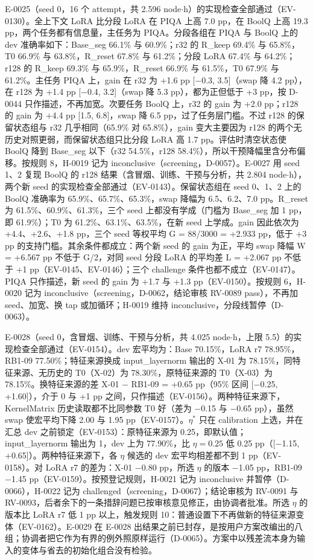\documentclass[11pt]{article}
\begin{document}
E-0025（seed 0，16 个 attempt，共 2.596 node$\cdot$h）的实现检查全部通过（EV-0130）。全上下文 LoRA 比分段 LoRA 在 PIQA 上高 7.0 pp，在 BoolQ 上高 19.3 pp，两个任务都有信息量，主任务为 PIQA。分段各组在 PIQA 与 BoolQ 上的 dev 准确率如下：Base\_seg 66.1\% 与 60.9\%；r32 的 R\_keep 69.4\% 与 65.8\%，T0 66.9\% 与 63.8\%，R\_reset 67.8\% 与 61.2\%；分段 LoRA 67.4\% 与 64.2\%；r128 的 R\_keep 69.3\% 与 65.9\%，R\_reset 66.9\% 与 61.5\%，T0 67.9\% 与 61.2\%。主任务 PIQA 上，gain 在 r32 为 +1.6 pp [$-$0.3, 3.5]（swap 降 4.2 pp），在 r128 为 +1.4 pp [$-$0.4, 3.2]（swap 降 5.3 pp），都为正但低于 +3 pp，按 D-0044 只作描述，不再加宽。次要任务 BoolQ 上，r32 的 gain 为 +2.0 pp；r128 的 gain 为 +4.4 pp [1.5, 6.8]，swap 降 6.5 pp，过了任务层门槛。不过 r128 的保留状态组与 r32 几乎相同（65.9\% 对 65.8\%），gain 变大主要因为 r128 的两个无历史对照更弱，而保留状态组只比分段 LoRA 高 1.7 pp。评估时清空状态使 BoolQ 降到 Base\_seg 以下（r32 54.5\%，r128 58.4\%），所以干预降幅里含分布偏移。按规则 8，H-0019 记为 inconclusive（screening，D-0057）。E-0027 用 seed 1、2 复现 BoolQ 的 r128 结果（含冒烟、训练、干预与分析，共 2.804 node$\cdot$h），两个新 seed 的实现检查全部通过（EV-0143）。保留状态组在 seed 0、1、2 上的 BoolQ 准确率为 65.9\%、65.7\%、65.3\%，swap 降幅为 6.5、6.2、7.0 pp。R\_reset 为 61.5\%、60.9\%、61.3\%，三个 seed 上都没有学成（门槛为 Base\_seg 加 1 pp，即 61.9\%）；T0 为 61.2\%、63.1\%、63.5\%，在新 seed 上学成。gain 因此依次为 +4.4、+2.6、+1.8 pp，三个 seed 等权平均 G = 88/3000 = +2.933 pp，低于 +3 pp 的支持门槛。其余条件都成立：两个新 seed 的 gain 为正，平均 swap 降幅 W = +6.567 pp 不低于 G/2，对同 seed 分段 LoRA 的平均差 L = +2.067 pp 不低于 +1 pp（EV-0145、EV-0146）；三个 challenge 条件也都不成立（EV-0147）。PIQA 只作描述，新 seed 的 gain 为 +1.7 与 +1.3 pp（EV-0150）。按规则 6，H-0020 记为 inconclusive（screening，D-0062，结论审核 RV-0089 pass），不再加 seed、加宽、换 tap 或加循环；H-0019 维持 inconclusive，分段线暂停（D-0063）。

E-0028（seed 0，含冒烟、训练、干预与分析，共 4.025 node$\cdot$h，上限 5.5）的实现检查全部通过（EV-0154）。dev 宏平均为：Base 70.15\%，LoRA r7 78.95\%，RB1-09 77.50\%；特征来源换成 input\_layernorm 输出的 X-01 为 78.15\%，同特征来源、无历史的 T0（X-02）为 78.30\%，原特征来源的 T0（X-03）为 78.15\%。换特征来源的差 X-01 $-$ RB1-09 = +0.65 pp（95\% 区间 [$-$0.25, +1.60]），介于 0 与 +1 pp 之间，只作描述（EV-0156）。两种特征来源下，KernelMatrix 历史读取都不比同参数 T0 好（差为 $-$0.15 与 $-$0.65 pp），虽然 swap 使宏平均下降 2.00 与 1.95 pp（EV-0157）。$\eta^*$ 只在 calibration 上选，并在汇总 dev 之前锁定（EV-0153）：原特征来源为 0.25，即默认值；input\_layernorm 输出为 1，dev 上为 77.90\%，比 $\eta = 0.25$ 低 0.25 pp（[$-$1.15, +0.65]）。两种特征来源下，各 $\eta$ 候选的 dev 宏平均相差都不到 1 pp（EV-0158）。对 LoRA r7 的差为：X-01 $-$0.80 pp，所选 $\eta$ 的版本 $-$1.05 pp，RB1-09 $-$1.45 pp（EV-0159）。按预登记规则，H-0021 记为 inconclusive 并暂停（D-0066），H-0022 记为 challenged（screening，D-0067）；结论审核为 RV-0091 与 RV-0093，后者余下的一条措辞问题已按审核意见修正，由协调者批准。所选 $\eta$ 的版本比 LoRA r7 低 1 pp 以上，触发规则 10：普通设置下不再做新的特征来源变体（EV-0162）。E-0029 在 E-0028 出结果之前已封存，是按用户方案改编出的八组；协调者把它作为有界的例外照原样运行（D-0065）。方案中以残差流本身为输入的变体与省去的初始化组合没有检验。
\end{document}
